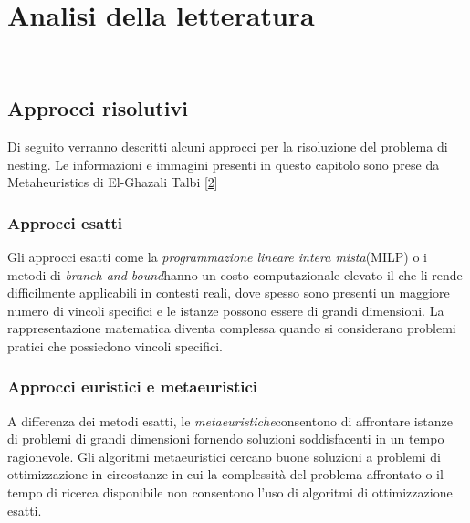 \chapter{Analisi della letteratura}
\label{cap:descrizione-stage}

\\

\section{Approcci risolutivi}

Di seguito verranno descritti alcuni approcci per la risoluzione del problema di nesting. Le informazioni e immagini presenti in questo capitolo sono prese da Metaheuristics di El-Ghazali Talbi [\hyperlink{bibliografia}{2}]

\subsection{Approcci esatti}

Gli approcci esatti come la \emph{programmazione lineare intera mista}\glsfirstoccur (MILP) o i metodi di \emph{branch-and-bound}\glsfirstoccur hanno un costo computazionale elevato il che li rende difficilmente applicabili in contesti reali, dove spesso sono presenti un maggiore numero di vincoli specifici e le istanze possono essere di grandi dimensioni. La rappresentazione matematica diventa complessa quando si considerano problemi pratici che possiedono vincoli specifici.

\subsection{Approcci euristici e metaeuristici} \hypertarget{metaeuristiche}{}

A differenza dei metodi esatti, le \emph{metaeuristiche}\glsfirstoccur consentono di affrontare istanze di problemi di grandi dimensioni fornendo soluzioni soddisfacenti in un tempo ragionevole. Gli algoritmi metaeuristici cercano buone soluzioni a problemi di ottimizzazione in circostanze in cui la complessità del problema affrontato o il tempo di ricerca disponibile non consentono l'uso di algoritmi di ottimizzazione esatti.

